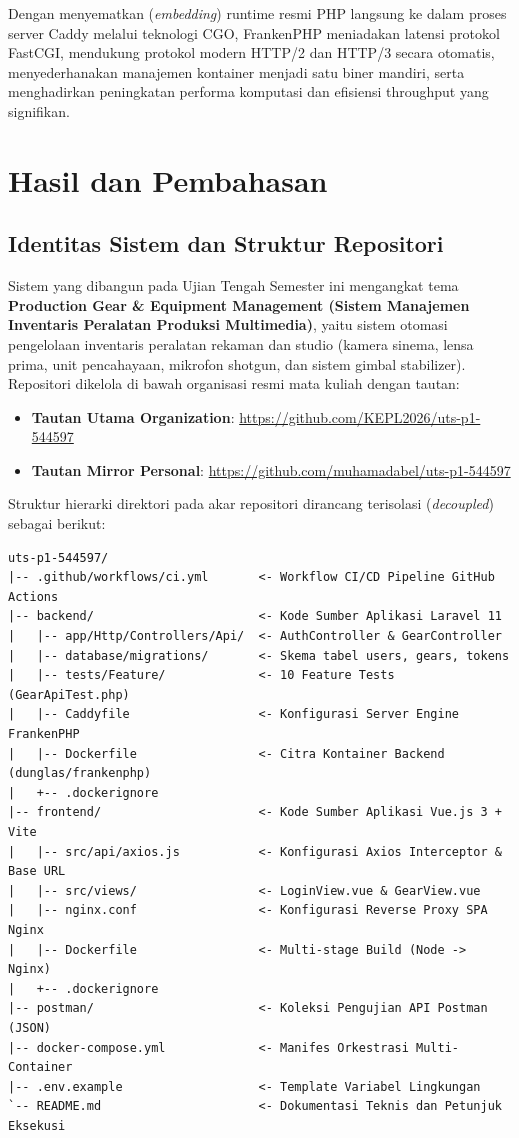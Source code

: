 \documentclass[a4paper,oneside,11pt]{book}
\begin{document}
Dengan menyematkan (\textit{embedding}) runtime resmi PHP langsung ke dalam proses server Caddy melalui teknologi CGO, FrankenPHP meniadakan latensi protokol FastCGI, mendukung protokol modern HTTP/2 dan HTTP/3 secara otomatis, menyederhanakan manajemen kontainer menjadi satu biner mandiri, serta menghadirkan peningkatan performa komputasi dan efisiensi throughput yang signifikan.

\chapter{Hasil dan Pembahasan}

\section{Identitas Sistem dan Struktur Repositori}
Sistem yang dibangun pada Ujian Tengah Semester ini mengangkat tema \textbf{Production Gear \& Equipment Management (Sistem Manajemen Inventaris Peralatan Produksi Multimedia)}, yaitu sistem otomasi pengelolaan inventaris peralatan rekaman dan studio (kamera sinema, lensa prima, unit pencahayaan, mikrofon shotgun, dan sistem gimbal stabilizer). Repositori dikelola di bawah organisasi resmi mata kuliah dengan tautan:
\begin{itemize}
\item \textbf{Tautan Utama Organization}: \url{https://github.com/KEPL2026/uts-p1-544597}
\item \textbf{Tautan Mirror Personal}: \url{https://github.com/muhamadabel/uts-p1-544597}
\end{itemize}

Struktur hierarki direktori pada akar repositori dirancang terisolasi (\textit{decoupled}) sebagai berikut:
\begin{lstlisting}[style=outstyle]
uts-p1-544597/
|-- .github/workflows/ci.yml       <- Workflow CI/CD Pipeline GitHub Actions
|-- backend/                       <- Kode Sumber Aplikasi Laravel 11
|   |-- app/Http/Controllers/Api/  <- AuthController & GearController
|   |-- database/migrations/       <- Skema tabel users, gears, tokens
|   |-- tests/Feature/             <- 10 Feature Tests (GearApiTest.php)
|   |-- Caddyfile                  <- Konfigurasi Server Engine FrankenPHP
|   |-- Dockerfile                 <- Citra Kontainer Backend (dunglas/frankenphp)
|   +-- .dockerignore
|-- frontend/                      <- Kode Sumber Aplikasi Vue.js 3 + Vite
|   |-- src/api/axios.js           <- Konfigurasi Axios Interceptor & Base URL
|   |-- src/views/                 <- LoginView.vue & GearView.vue
|   |-- nginx.conf                 <- Konfigurasi Reverse Proxy SPA Nginx
|   |-- Dockerfile                 <- Multi-stage Build (Node -> Nginx)
|   +-- .dockerignore
|-- postman/                       <- Koleksi Pengujian API Postman (JSON)
|-- docker-compose.yml             <- Manifes Orkestrasi Multi-Container
|-- .env.example                   <- Template Variabel Lingkungan
`-- README.md                      <- Dokumentasi Teknis dan Petunjuk Eksekusi
\end{lstlisting}
\end{document}
